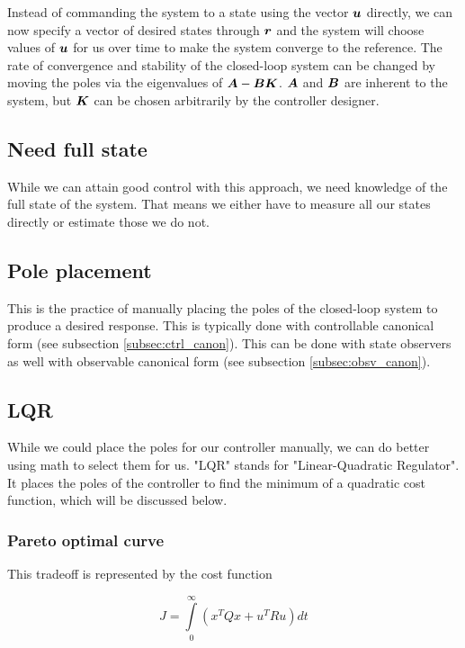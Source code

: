 Instead of commanding the system to a state using the vector $\bm u$ directly,
we can now specify a vector of desired states through $\bm r$ and the system
will choose values of $\bm u$ for us over time to make the system converge to
the reference. The rate of convergence and stability of the closed-loop system
can be changed by moving the poles via the eigenvalues of $\bm A -
\bm B\bm K$. $\bm A$ and $\bm B$ are inherent to the system, but
$\bm K$ can be chosen arbitrarily by the controller designer.

\subsection{Need full state}

While we can attain good control with this approach, we need knowledge of the
full state of the system. That means we either have to measure all our states
directly or estimate those we do not.

\subsection{Pole placement}

This is the practice of manually placing the poles of the closed-loop system to
produce a desired response. This is typically done with controllable canonical
form (see subsection \ref{subsec:ctrl_canon}). This can be done with state
observers as well with observable canonical form (see subsection
\ref{subsec:obsv_canon}).

\subsection{LQR}

While we could place the poles for our controller manually, we can do better
using math to select them for us. "LQR" stands for "Linear-Quadratic Regulator".
It places the poles of the controller to find the minimum of a quadratic cost
function, which will be discussed below.

\subsubsection{Pareto optimal curve}

This tradeoff is represented by the cost function

\begin{equation*}
  J = \int\limits_0^\infty \left(x^T Q x + u^T R u \right) dt
\end{equation*}

